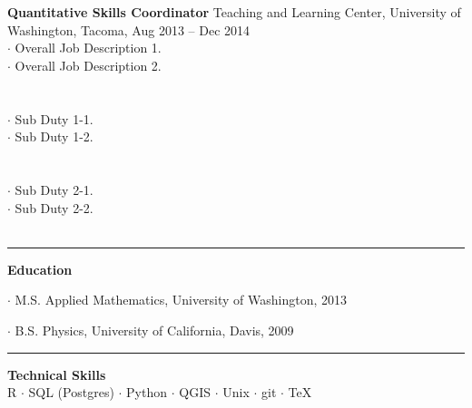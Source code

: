 \documentclass[letterpaper, onecolumn, oneside]{article}
\newcommand{\dotindent}{\hspace*{.25in}$\cdot$ }
\newcommand{\spaceindent}{\hspace*{0.1in}}
\begin{document}
\begin{flushleft}


\textbf{\large Quantitative Skills Coordinator} Teaching and Learning Center, University of Washington, Tacoma, Aug 2013 -- Dec 2014 \\
\dotindent Overall Job Description 1. \\
\dotindent Overall Job Description 2.\\
~\\

\spaceindent {\bf Major Sub Duty 1} \\
\dotindent Sub Duty 1-1.\\
\dotindent Sub Duty 1-2.\\
~\\

\spaceindent {\bf Major Sub Duty 2} \\
\dotindent Sub Duty 2-1.\\
\dotindent Sub Duty 2-2.\\
~\\

\textcolor{litegrey}{\rule{\textwidth}{.1pt}}

\vspace*{0.1in}
\textbf{\large Education}
\vspace*{0.05in}

\dotindent M.S. Applied Mathematics, University of Washington, 2013

\dotindent B.S. Physics, University of California, Davis, 2009

\textcolor{litegrey}{\rule{\textwidth}{.1pt}}

\end{flushleft}


\begin{centering}

{\bf Technical Skills} \\
R $\cdot$ SQL (Postgres)  $\cdot$ Python  $\cdot$ QGIS   $\cdot$  Unix   $\cdot$  git   $\cdot$  \TeX \\ 

\end{centering}
\end{document}
